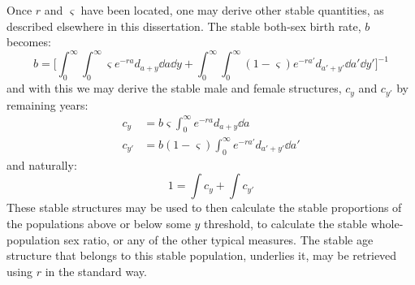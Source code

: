 
Once $r$ and $\varsigma$ have been located, one may derive other stable
quantities, as described elsewhere in this dissertation. The stable both-sex
birth rate, $b$ becomes:
\begin{equation}
b = \Bigg[\int_0^\infty  \int _0^\infty \varsigma
 e^{-ra}d_{a+y}\dd a \dd y + \int_0^\infty \int _0^\infty (1-\varsigma)
 e^{-ra'}d_{a'+y'} \dd a' \dd y' \Bigg] ^{-1}
\end{equation}
and with this we may derive the stable male and female structures, $c_y$ and
$c_{y'}$ by remaining years:
\begin{align}
c_y &= b\varsigma \int _0^\infty e^{-ra}d_{a+y}\dd a \\
c_{y'} &= b(1-\varsigma) \int _0^\infty e^{-ra'}d_{a'+y'}\dd a'
\end{align}
and naturally:
\begin{equation}
1 = \int c_y + \int c_{y'}
\end{equation}
These stable structures may be used to then calculate the stable proportions of
the populations above or below some $y$ threshold, to calculate the stable
whole-population sex ratio, or any of the other typical measures. The stable age
structure that belongs to this stable population, underlies it, may be retrieved
using $r$ in the standard way.
